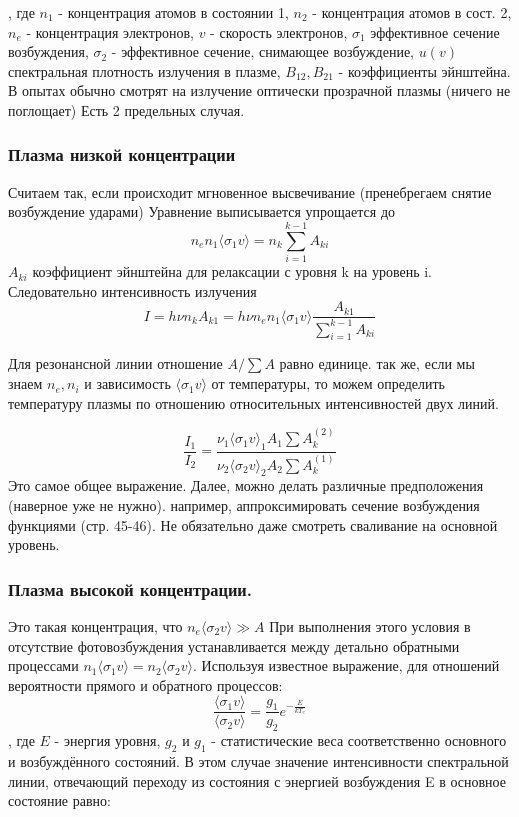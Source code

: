 \documentclass[10pt, a4paper]{article}
\begin{document}
, где $n_1$ - концентрация атомов в состоянии 1, $n_2$ - концентрация атомов в сост. 2, $n_e$ - концентрация электронов, $v$ - скорость электронов, $\sigma_1$ эффективное сечение возбуждения, $\sigma_2$ - эффективное сечение, снимающее возбуждение, $u(v)$ спектральная плотность излучения в плазме, $B_{12}, B_{21}$ - коэффициенты эйнштейна. В опытах обычно смотрят на излучение оптически прозрачной плазмы (ничего не поглощает) Есть 2 предельных случая.

\subsubsection{Плазма низкой концентрации}

Считаем так, если происходит мгновенное высвечивание (пренебрегаем снятие возбуждение ударами)
Уравнение выписывается упрощается до 
\begin{equation}
	n_e n_1 \langle\sigma_1 v\rangle= n_k  \sum\limits_{i=1}^{k-1}A_{k i}
\end{equation}
$A_{k i}$ коэффициент эйнштейна для релаксации с уровня k на уровень i.
Следовательно интенсивность излучения 
\begin{equation}
	I=h \nu n_k A_{k1}=h \nu n_e n_1 \langle\sigma_1 v\rangle\frac{A_{k1}}{\sum\limits_{i=1}^{k-1} A_{ki}}
\end{equation}

Для резонансной линии отношение $A/\sum A $ равно единице. так же, если мы знаем $n_e, n_i$ и зависимость $\langle\sigma_1 v\rangle$ от температуры, то можем определить температуру плазмы по отношению относительных интенсивностей двух линий.

\begin{equation}
	\frac{I_1}{I_2}= \frac {\nu_1 \langle\sigma_1 v\rangle_1 A_1 \sum A_k^{(2)} }{\nu_2 \langle\sigma_2 v\rangle_2 A_2 \sum A_k^{(1)} }
\end{equation}
Это самое общее выражение. Далее, можно делать различные предположения (наверное уже не нужно). например, аппроксимировать сечение возбуждения функциями (стр. 45-46).
Не обязательно даже смотреть сваливание на основной уровень.

\subsubsection{Плазма высокой концентрации.}

Это такая концентрация, что $n_e \langle\sigma_2 v\rangle \gg A$ 
При выполнения этого условия в отсутствие фотовозбуждения устанавливается между детально обратными процессами $n_1 \langle\sigma_1 v\rangle = n_2 \langle\sigma_2 v\rangle$.
Используя известное выражение, для отношений вероятности прямого и обратного процессов:
\begin{equation}
	\frac{\langle\sigma_1 v\rangle}{\langle\sigma_2 v\rangle} = \frac{g_1}{g_2} e^{-\frac{E}{kT_e}}
\end{equation}
, где $E$ -  энергия уровня, $g_2$ и $g_1$  - статистические веса соответственно основного и возбуждённого состояний.
В этом случае значение интенсивности спектральной линии, отвечающий переходу из состояния с энергией возбуждения E в основное состояние равно:
\end{document}
